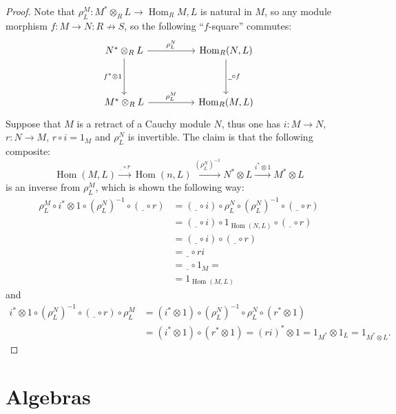 \documentclass[8pt]{article}
\theoremstyle{definition}
\theoremstyle{definition}
\theoremstyle{definition}
\theoremstyle{definition}
\theoremstyle{definition}
\theoremstyle{definition}
\theoremstyle{definition}
\theoremstyle{definition}
\theoremstyle{definition}
\theoremstyle{definition}
\theoremstyle{definition}
\theoremstyle{definition}
\theoremstyle{definition}
\theoremstyle{definition}
\theoremstyle{question}
\begin{document}
\begin{proof}
  Note that $\rho^M_L : M^* \otimes_R L \to \operatorname{Hom}_R{M,L}$ is natural in $M$, so any module morphism
  $f : M \to N : R \not\to S$, so the following ``$f$-square'' commutes:
  \[
  \begin{tikzcd}
    N^* \otimes_R L \ar[dd, "f^* \otimes 1"'] \ar[rr, "\rho^N_L"] && \operatorname{Hom}_R(N,L) \ar[dd, "\underline{\:\:} \circ f"] \\
    \\
    M^* \otimes_R L \ar[rr, "\rho^M_L"] && \operatorname{Hom}_R(M,L)
  \end{tikzcd}
  \]
  Suppose that $M$ is a retract of a Cauchy module $N$, thus one has $i : M \to N$, $r : N \to M$,
  $r \circ i = 1_M$ and $\rho^N_L$ is invertible. The claim is that the following composite:
  \[
  \operatorname{Hom}(M, L) \xrightarrow{\underline{\:\:} \circ r} \operatorname{Hom}(n,L) \xrightarrow{(\rho^N_L)^{-1}} N^* \otimes L \xrightarrow{i^* \otimes 1} M^* \otimes L
  \]
  is an inverse from $\rho^M_L$, which is shown the following way:
  \begin{align*}
    \rho^M_L \circ i^* \otimes 1 \circ (\rho^N_L)^{-1} \circ (\underline{\:\:} \circ r) &= (\underline{\:\:} \circ i) \circ \rho^N_L \circ (\rho^N_L)^{-1} \circ (\underline{\:\:} \circ r) \\
    &= (\underline{\:\:} \circ i) \circ 1_{\operatorname{Hom}(N,L)} \circ (\underline{\:\:} \circ r) \\
    &= (\underline{\:\:} \circ i) \circ (\underline{\:\:} \circ r) \\
    &= \underline{\:\:} \circ ri \\
    &= \underline{\:\:} \circ 1_M = \\
    &= 1_{\operatorname{Hom}(M,L)}
  \end{align*}
  and
  \begin{align*}
    i^* \otimes 1 \circ (\rho^N_L)^{-1} \circ (\underline{\:\:} \circ r) \circ \rho^M_L &= (i^* \otimes 1) \circ  (\rho^N_L)^{-1} \circ \rho^N_L \circ (r^* \otimes 1) \\
    &= (i^* \otimes 1) \circ (r^* \otimes 1) = (ri)^* \otimes 1 = 1_{M^*} \otimes 1_L = 1_{M^* \otimes L}.
  \end{align*}
\end{proof}


\section{Algebras}
\end{document}
